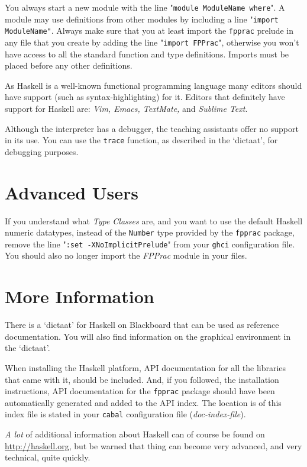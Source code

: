 \documentclass[]{article}
\begin{document}
You always start a new module with the line "\texttt{module ModuleName where}".
A module may use definitions from other modules by including a line "\texttt{import ModuleName"}.
Always make sure that you at least import the \texttt{fpprac} prelude in any file that you create by adding the line "\texttt{import FPPrac}", otherwise you won't have access to all the standard function and type definitions.
Imports must be placed before any other definitions.

As Haskell is a well-known functional programming language many editors should have support (such as syntax-highlighting) for it.
Editors that definitely have support for Haskell are: \emph{Vim, Emacs, TextMate,} and \emph{Sublime Text}.

Although the interpreter has a debugger, the teaching assistants offer no support in its use.
You can use the \texttt{trace} function, as described in the `dictaat', for debugging purposes.

\section{Advanced Users}
If you understand what \emph{Type Classes} are, and you want to use the default Haskell numeric datatypes, instead of the \texttt{Number} type provided by the \texttt{fpprac} package, remove the line "\texttt{:set -XNoImplicitPrelude}" from your \texttt{ghci} configuration file.
You should also no longer import the \emph{FPPrac} module in your files.

\section{More Information}
There is a `dictaat' for Haskell on Blackboard that can be used as reference documentation.
You will also find information on the graphical environment in the `dictaat'.

When installing the Haskell platform, API documentation for all the libraries that came with it, should be included.
And, if you followed, the installation instructions, API documentation for the \texttt{fpprac} package should have been automatically generated and added to the API index.
The location is of this index file is stated in your \texttt{cabal} configuration file (\emph{doc-index-file}).

\emph{A lot} of additional information about Haskell can of course be found on \url{http://haskell.org}, but be warned that thing can become very advanced, and very technical, quite quickly.
\end{document}
